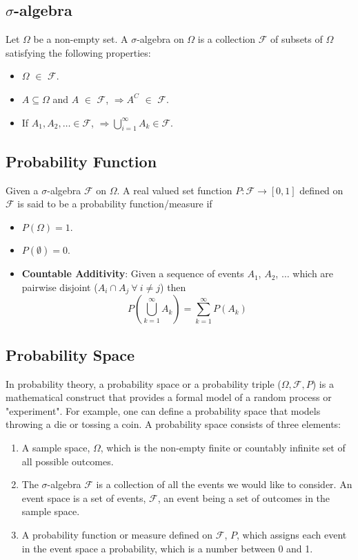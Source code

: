 \documentclass[twoside,final]{hcmut-report}
\begin{document}
  \subsection{\texorpdfstring{$\sigma$-algebra}{sigma-algebra}} Let $\Omega$ be a non-empty set. A $\sigma$-algebra on $\Omega$ is a collection $\mathcal{F}$ of subsets of $\Omega$ satisfying the following properties:
      \begin{itemize}
          \item $\Omega$ $\in$ $\mathcal{F}$.
          \item $A \subseteq \Omega$ and $A$ $\in$ $\mathcal{F}$, $\Rightarrow A ^ C$  $\in$ $\mathcal{F}$.
          \item  If $A_1, A_2, \dots \in \mathcal{F}$, $ \Rightarrow \bigcup_{i=1}^{\infty} A_k \in \mathcal{F}$.
       \end{itemize}
         \subsection{Probability Function} Given a $\sigma$-algebra $\mathcal{F}$ on $\Omega$. A real valued set function $P \colon \mathcal{F} \rightarrow [0,1]$ defined on $\mathcal{F}$ is said to be a probability function/measure if
       \begin{itemize}
         \item $P(\Omega) = 1$.
         \item $P(\emptyset) = 0$.
         \item  \textbf{Countable Additivity}:
       Given a sequence of events $A_1$, $A_2$, $\dots$ which are pairwise disjoint ($A_i \cap A_j \ \forall \ i \neq j$) then \[
     P\left(\bigcup_{k=1}^\infty A_k\right) = \sum_{k=1}^\infty P(A_k)
     \]
      \end{itemize}
        \subsection{Probability Space} In probability theory, a probability space or a probability triple ($\Omega,\mathcal{F},P$) is a mathematical construct that provides a formal model of a random process or "experiment". For example, one can define a probability space that models throwing a die or tossing a coin.
A probability space consists of three elements:
\begin{enumerate}
	\item A sample space, $\Omega$, which is the non-empty finite or countably infinite set of all possible outcomes.
	\item The $\sigma$-algebra $\mathcal{F}$ is a collection of all the events we would like to consider. An event space is a set of events, $\mathcal{F}$, an event being a set of outcomes in the sample space.
	\item A probability function or measure defined on $\mathcal{F}$, $P$, which assigns each event in the event space a probability, which is a number between 0 and 1.
\end{enumerate}
\end{document}

